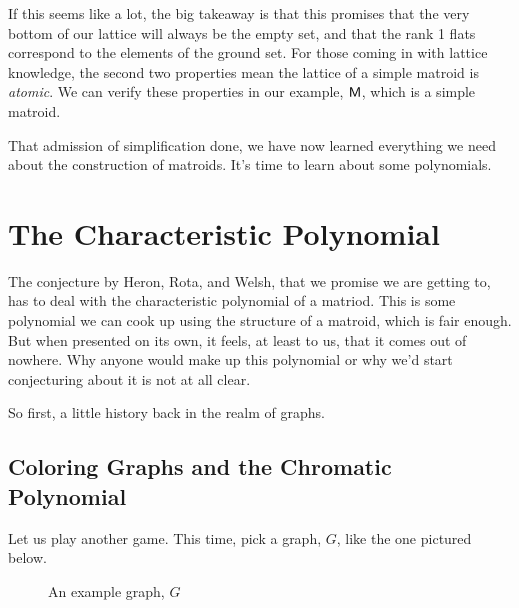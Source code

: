 \documentclass[12pt,oneside]{../../sfsuthesis}
\begin{document}
If this seems like a lot, the big takeaway is that this promises that the very bottom of our lattice will always be the empty set, and that the rank 1 flats correspond to the elements of the ground set.
For those coming in with lattice knowledge, the second two properties mean the lattice of a simple matroid is \emph{atomic}.
We can verify these properties in our example, \( \mathsf{M} \), which is a simple matroid.

That admission of simplification done, we have now learned everything we need about the construction of matroids.
It's time to learn about some polynomials.

\section{The Characteristic Polynomial}

The conjecture by Heron, Rota, and Welsh, that we promise we are getting to, has to deal with the characteristic polynomial of a matriod.
This is some polynomial we can cook up using the structure of a matroid, which is fair enough.
But when presented on its own, it feels, at least to us, that it comes out of nowhere.
Why anyone would make up this polynomial or why we'd start conjecturing about it is not at all clear.

So first, a little history back in the realm of graphs.

\subsection{Coloring Graphs and the Chromatic Polynomial}

Let us play another game.
This time, pick a graph, \( G \), like the one pictured below.

\begin{figure}[H]
    \centering
    \caption{An example graph, \(G\)}
\end{figure}
\end{document}
